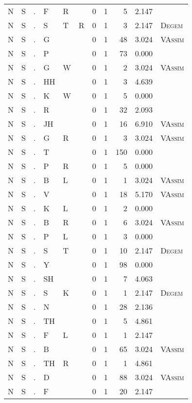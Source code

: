 \begin{longtable}{r@{ } r@{ } c@{ } l@{ } l@{ } l@{ } r r r r l }
N & S & . & F & R &  & 0 & 1 & 5 & 2.147 &  \\
N & S & . & S & T & R & 0 & 1 & 3 & 2.147 & \textsc{Degem} \\
N & S & . & G &  &  & 0 & 1 & 48 & 3.024 & \textsc{VAssim} \\
N & S & . & P &  &  & 0 & 1 & 73 & 0.000 &  \\
N & S & . & G & W &  & 0 & 1 & 2 & 3.024 & \textsc{VAssim} \\
N & S & . & HH &  &  & 0 & 1 & 3 & 4.639 &  \\
N & S & . & K & W &  & 0 & 1 & 5 & 0.000 &  \\
N & S & . & R &  &  & 0 & 1 & 32 & 2.093 &  \\
N & S & . & JH &  &  & 0 & 1 & 16 & 6.910 & \textsc{VAssim} \\
N & S & . & G & R &  & 0 & 1 & 3 & 3.024 & \textsc{VAssim} \\
N & S & . & T &  &  & 0 & 1 & 150 & 0.000 &  \\
N & S & . & P & R &  & 0 & 1 & 5 & 0.000 &  \\
N & S & . & B & L &  & 0 & 1 & 1 & 3.024 & \textsc{VAssim} \\
N & S & . & V &  &  & 0 & 1 & 18 & 5.170 & \textsc{VAssim} \\
N & S & . & K & L &  & 0 & 1 & 2 & 0.000 &  \\
N & S & . & B & R &  & 0 & 1 & 6 & 3.024 & \textsc{VAssim} \\
N & S & . & P & L &  & 0 & 1 & 3 & 0.000 &  \\
N & S & . & S & T &  & 0 & 1 & 10 & 2.147 & \textsc{Degem} \\
N & S & . & Y &  &  & 0 & 1 & 98 & 0.000 &  \\
N & S & . & SH &  &  & 0 & 1 & 7 & 4.063 &  \\
N & S & . & S & K &  & 0 & 1 & 1 & 2.147 & \textsc{Degem} \\
N & S & . & N &  &  & 0 & 1 & 28 & 2.136 &  \\
N & S & . & TH &  &  & 0 & 1 & 5 & 4.861 &  \\
N & S & . & F & L &  & 0 & 1 & 1 & 2.147 &  \\
N & S & . & B &  &  & 0 & 1 & 65 & 3.024 & \textsc{VAssim} \\
N & S & . & TH & R &  & 0 & 1 & 1 & 4.861 &  \\
N & S & . & D &  &  & 0 & 1 & 88 & 3.024 & \textsc{VAssim} \\
N & S & . & F &  &  & 0 & 1 & 20 & 2.147 &  \\

\end{longtable}

